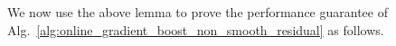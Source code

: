 We now use the above lemma to prove the performance guarantee of Alg.~\ref{alg:online_gradient_boost_non_smooth_residual} as follows.
